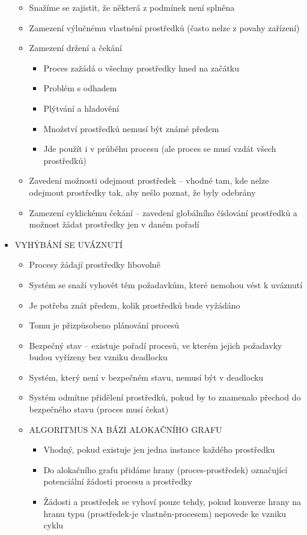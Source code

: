 \documentclass[10pt,a4paper]{article}
\begin{document}
\begin{itemize}
\begin{itemize}
		\item Snažíme se zajistit, že některá z podmínek není splněna
		\item Zamezení výlučnému vlastnění prostředků (často nelze z povahy zařízení)
		\item Zamezení držení a čekání
		\begin{itemize}
			\item Proces zažádá o všechny prostředky hned na začátku
			\item Problém s odhadem
			\item Plýtvání a hladovění
			\item Množství prostředků nemusí být známé předem
			\item Jde použít i v průběhu procesu (ale proces se musí vzdát všech prostředků)
		\end{itemize}
		\item Zavedení možnosti odejmout prostředek – vhodné tam, kde nelze odejmout prostředky tak, aby nešlo poznat, že byly odebrány
		\item Zamezení cyklickému čekání – zavedení globálního číslování prostředků a možnost žádat prostředky jen v daném pořadí
	\end{itemize}
	\item VYHÝBÁNÍ SE UVÁZNUTÍ
	\begin{itemize}
		\item Procesy žádají prostředky libovolně
		\item Systém se snaží vyhovět těm požadavkům, které nemohou vést k uváznutí
		\item Je potřeba znát předem, kolik prostředků bude vyžádáno
		\item Tomu je přizpůsobeno plánování procesů
		\item Bezpečný stav – existuje pořadí procesů, ve kterém jejich požadavky budou vyřízeny bez vzniku deadlocku
		\item Systém, který není v bezpečném stavu, nemusí být v deadlocku
		\item Systém odmítne přidělení prostředků, pokud by to znamenalo přechod do bezpečného stavu (proces musí čekat)
		\item ALGORITMUS NA BÁZI ALOKAČNÍHO GRAFU
		\begin{itemize}
			\item Vhodný, pokud existuje jen jedna instance každého prostředku
			\item Do alokačního grafu přidáme hrany (proces-prostředek) označující potenciální žádosti procesu a prostředky
			\item Žádosti a prostředek se vyhoví pouze tehdy, pokud konverze hrany na hranu typu (prostředek-je vlastněn-procesem) nepovede ke vzniku cyklu

\end{itemize}
\end{itemize}
\end{itemize}
\end{document}
